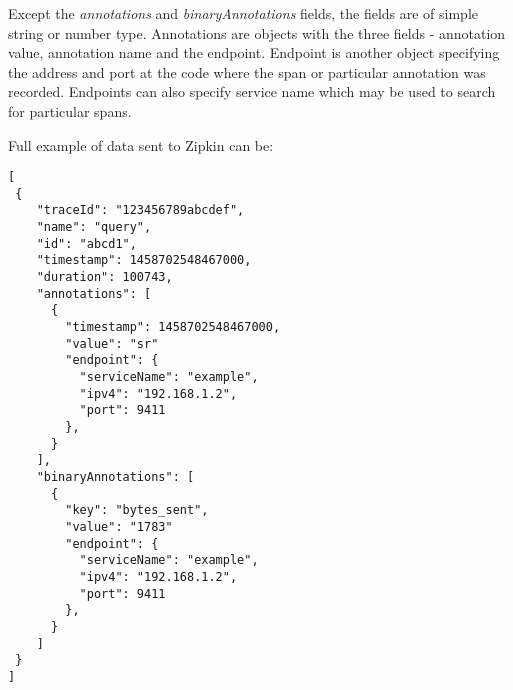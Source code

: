 Except the \textit{annotations} and \textit{binaryAnnotations} fields, the fields are of simple string or number type. Annotations are objects with the three fields - annotation value, annotation name and the endpoint. Endpoint is another object specifying the address and port at the code where the span or particular annotation was recorded. Endpoints can also specify service name which may be used to search for particular spans.

Full example of data sent to Zipkin can be:
\begin{lstlisting}[emph={traceId, name, id, timestamp, duration, annotations, value, endpoint, serviceName, ipv4, port, binnaryAnnotations, key},emphstyle={\textbf}]
[
 {
    "traceId": "123456789abcdef",
    "name": "query",
    "id": "abcd1",
    "timestamp": 1458702548467000,
    "duration": 100743,
    "annotations": [
      {
        "timestamp": 1458702548467000,
        "value": "sr"
        "endpoint": {
          "serviceName": "example",
          "ipv4": "192.168.1.2",
          "port": 9411
        },
      }
    ],
    "binaryAnnotations": [
      {
        "key": "bytes_sent",
        "value": "1783"
        "endpoint": {
          "serviceName": "example",
          "ipv4": "192.168.1.2",
          "port": 9411
        },
      }
    ]
 }
]
\end{lstlisting}


